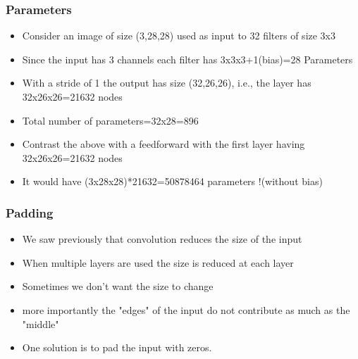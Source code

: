 \documentclass{beamer}
\begin{document}
\begin{frame}
    \frametitle{Parameters}
    \begin{itemize}
        \item Consider an image of size (3,28,28) used as input to 32 filters of size 3x3
        \item Since the input has 3 channels each filter has 3x3x3+1(bias)=28 Parameters
        \item With a stride of 1 the output has size (32,26,26), i.e., the layer has 32x26x26=21632 nodes
        \item Total number of parameters=32x28=896
        \item Contrast the above with a feedforward with the first layer having 32x26x26=21632 nodes
        \item It would have (3x28x28)*21632=50878464 parameters !(without bias)
    \end{itemize}
    

\end{frame}
\begin{frame}
    \frametitle{Padding}
    \begin{itemize}
        \item We saw previously that convolution reduces the size of the input
        \item When multiple layers are used the size is reduced at each layer
        \item Sometimes we don't want the size to change
        \item more importantly the "edges" of the input do not contribute as much as the "middle"
        \item One solution is to pad the input with zeros.
    \end{itemize}
\end{frame}
\end{document}

